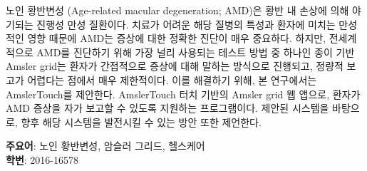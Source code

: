 \documentclass[doctor]{snuece-bs}
\begin{document}
\begin{summary}
	\par
	
	노인 황반변성 (Age-related macular degeneration; AMD)은 황반 내 손상에 의해 야기되는 진행성 만성 질환이다. 치료가 어려운 해당 질병의 특성과 환자에 미치는 만성적인 영향 때문에 AMD는 증상에 대한 정확한 진단이 매우 중요하다. 하지만, 전세계적으로 AMD를 진단하기 위해 가장 널리 사용되는 테스트 방법 중 하나인 종이 기반 Amsler grid는 환자가 간접적으로 증상에 대해 말하는 방식으로 진행되고, 정량적 보고가 어렵다는 점에서 매우 제한적이다. 이를 해결하기 위해, 본 연구에서는 AmslerTouch를 제안한다. AmslerTouch 터치 기반의 Amsler grid 웹 앱으로, 환자가 AMD 증상을 자가 보고할 수 있도록 지원하는 프로그램이다. 제안된 시스템을 바탕으로, 향후 해당 시스템을 발전시킬 수 있는 방안 또한 제언한다.
	\vfill
	\begin{minipage}[t][20mm][b]{\textwidth}
		{\bfseries 주요어}: 노인 황반변성, 암슬러 그리드, 헬스케어\\
		{\bfseries 학번}: 2016-16578\\
	\end{minipage}
\end{summary}
\end{document}
